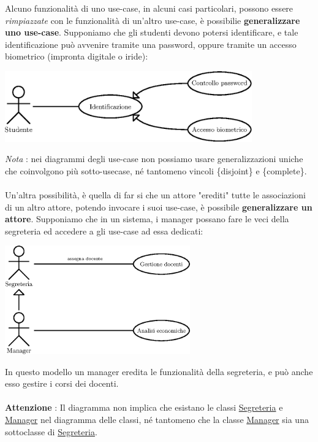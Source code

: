 \documentclass[12pt, letterpaper]{article}
\newcommand{\acc}{\\\hphantom{}\\}
\begin{document}
Alcuno funzionalità di uno use-case, in alcuni casi particolari, possono essere \textit{rimpiazzate} con le 
funzionalità di un'altro use-case, è possibilie \textbf{generalizzare uno use-case}. Supponiamo che gli studenti devono 
potersi identificare, e tale identificazione può avvenire tramite una password, oppure tramite un accesso biometrico 
(impronta digitale o iride):\begin{center}
    \includegraphics[width=0.8\textwidth ]{images/useCasegeneralizzazione.eps}
\end{center}
\textit{Nota} : nei diagrammi degli use-case non possiamo usare
generalizzazioni uniche che coinvolgono più sotto-usecase, né tantomeno vincoli \{disjoint\} e \{complete\}.\acc 
Un'altra possibilità, è quella di far si che un attore "erediti" tutte le associazioni di un altro attore, potendo 
invocare i suoi use-case, è possibile \textbf{generalizzare un attore}. Supponiamo che in un sistema, i 
manager possano fare le veci della segreteria ed accedere a gli use-case ad essa dedicati:\begin{center}
    \includegraphics[width=0.6\textwidth ]{images/generalizzazioneAttori.eps}
\end{center}
In questo modello un manager eredita le funzionalità della segreteria, e può anche esso gestire i corsi dei docenti.\acc
\textbf{Attenzione} : Il diagramma non implica che esistano le classi \underline{Segreteria} e \underline{Manager} 
nel diagramma delle classi, né tantomeno che la classe \underline{Manager} sia una sottoclasse di
\underline{Segreteria}. 
\end{document}
